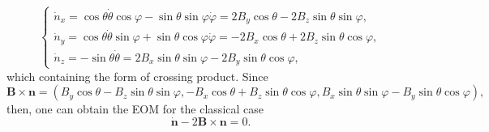 \begin{solution}
\begin{enumext}
\[\begin{cases}
        \dot n_x = \cos\theta \dot\theta \cos\varphi
          - \sin\theta \sin\varphi \dot\varphi
        = 2B_y\cos\theta - 2B_z \sin\theta \sin\varphi,\\
        \dot n_y = \cos\theta \dot\theta \sin\varphi
          + \sin\theta \cos\varphi \dot\varphi
        = -2B_x\cos\theta + 2B_z\sin\theta\cos\varphi,\\
        \dot n_z = -\sin\theta \dot\theta
        = 2B_x \sin\theta \sin\varphi - 2B_y \sin\theta \cos\varphi,
      \end{cases}
    \]
    which containing the form of crossing product. Since
    \[
      \bm B \times \bm n = (
        B_y \cos\theta - B_z \sin\theta \sin\varphi,
        -B_x \cos\theta + B_z \sin\theta \cos\varphi,
        B_x \sin\theta \sin\varphi - B_y \sin\theta \cos\varphi),
    \]
    then, one can obtain the EOM for the classical case
    \[
      \dot{\bm n} - 2\bm B \times \bm n = 0.
    \]
  \end{enumext}
\end{solution}

\clearpage

